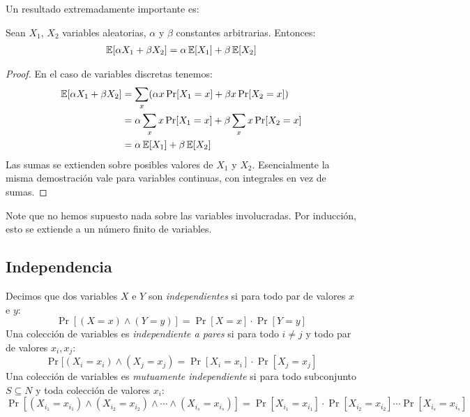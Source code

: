   Un resultado extremadamente importante
  es:
  \begin{theorem}
    \label{theo:E-lineal}
    Sean \(X_1\), \(X_2\) variables aleatorias,
    \(\alpha\) y \(\beta\) constantes arbitrarias.
    Entonces:
    \begin{align*}
      \operatorname{\mathbb{E}}[\alpha X_1 + \beta X_2]
        = \alpha \operatorname{\mathbb{E}}[X_1] + \beta \operatorname{\mathbb{E}}[X_2]
    \end{align*}
  \end{theorem}
  \begin{proof}
    En el caso de variables discretas tenemos:
    \begin{align*}
      \operatorname{\mathbb{E}}[ \alpha X_1 + \beta X_2 ]
        &= \sum_x
             (\alpha x \Pr[X_1 = x] + \beta x \Pr[X_2 = x]) \\
        &= \alpha \sum_x x \Pr[X_1 = x]
             + \beta \sum_x x \Pr[X_2 = x] \\
        &= \alpha \operatorname{\mathbb{E}}[X_1] + \beta \operatorname{\mathbb{E}}[X_2]
    \end{align*}
    Las sumas se extienden sobre posibles valores de \(X_1\) y \(X_2\).
    Esencialmente la misma demostración vale para variables continuas,
    con integrales en vez de sumas.
  \end{proof}
  Note que no hemos supuesto nada sobre las variables involucradas.
  Por inducción,
  esto se extiende a un número finito de variables.

\subsection{Independencia}
\label{sec:independencia}

  Decimos que dos variables \(X\) e \(Y\) son \emph{independientes}
  si para todo par de valores \(x\) e \(y\):
  \begin{equation}
    \label{eq:XY-independientes}
    \Pr[(X = x) \wedge (Y = y)]
      = \Pr[X = x] \cdot \Pr[Y = y]
  \end{equation}
  Una colección de variables es \emph{independiente a pares}
  si para todo \(i \ne j\) y todo par de valores \(x_i, x_j\):
  \begin{equation}
    \label{eq:eq:pares-independientes}
    \Pr[(X_i = x_i)
          \wedge (X_j = x_j)
      = \Pr[X_i = x_i]
          \cdot \Pr[X_j = x_j]
  \end{equation}
  Una colección de variables es \emph{mutuamente independiente}
  si para todo subconjunto \(S \subseteq N\)
  y toda colección de valores \(x_i\):
  \begin{equation}
    \label{eq:eq:mutuamente-independientes}
    \Pr[(X_{i_1} = x_{i_1})
          \wedge (X_{i_2} = x_{i_2})
          \wedge \dotsb
          \wedge (X_{i_s} = x_{i_s})]
      = \Pr[X_{i_1} = x_{i_1}]
          \cdot \Pr[X_{i_2} = x_{i_2}]
          \dotsm
          \Pr[X_{i_s} = x_{i_s}]
  \end{equation}

